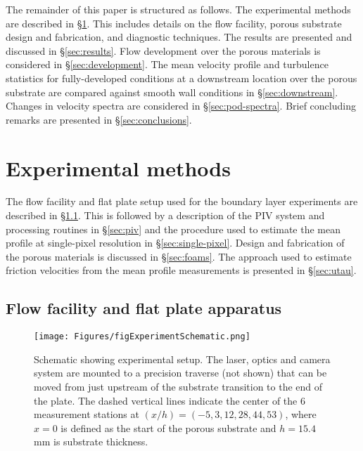 \documentclass[letterpaper,11pt]{article}
\begin{document}
The remainder of this paper is structured as follows.  The experimental methods are described in \S\ref{sec:expts}.  This includes details on the flow facility, porous substrate design and fabrication, and diagnostic techniques.  The results are presented and discussed in \S\ref{sec:results}. Flow development over the porous materials is considered in \S\ref{sec:development}.  The mean velocity profile and turbulence statistics for fully-developed conditions at a downstream location over the porous substrate are compared against smooth wall conditions in \S\ref{sec:downstream}.  Changes in velocity spectra are considered in \S\ref{sec:pod-spectra}. Brief concluding remarks are presented in \S\ref{sec:conclusions}.

\section{Experimental methods}\label{sec:expts}
The flow facility and flat plate setup used for the boundary layer experiments are described in \S\ref{sec:facility}. This is followed by a description of the PIV system and processing routines in \S\ref{sec:piv} and the procedure used to estimate the mean profile at single-pixel resolution in \S\ref{sec:single-pixel}.  Design and fabrication of the porous materials is discussed in \S\ref{sec:foams}.  The approach used to estimate friction velocities from the mean profile measurements is presented in \S\ref{sec:utau}.

\subsection{Flow facility and flat plate apparatus}\label{sec:facility}

\begin{figure}
\centering
\texttt{[image: Figures/figExperimentSchematic.png]}
\caption{Schematic showing experimental setup. The laser, optics and camera system are mounted to a precision traverse (not shown) that can be moved from just upstream of the substrate transition to the end of the plate. The dashed vertical lines indicate the center of the 6 measurement stations at $(x/h)=(-5,3,12,28,44,53)$, where $x=0$ is defined as the start of the porous substrate and $h = 15.4$ mm is substrate thickness.}
\label{fig:diag}
\end{figure}
\end{document}
